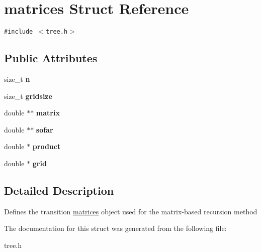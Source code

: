 \hypertarget{structmatrices}{
\section{matrices Struct Reference}
\label{structmatrices}
}
{\tt \#include $<$tree.h$>$}

\subsection*{Public Attributes}
\begin{CompactItemize}
\item 
\hypertarget{structmatrices_536069a6856792235214d6dab9941ce1}{
size\_\-t \textbf{n}}
\label{structmatrices_536069a6856792235214d6dab9941ce1}

\item 
\hypertarget{structmatrices_92cdda519980912b53ca23558f6d4014}{
size\_\-t \textbf{gridsize}}
\label{structmatrices_92cdda519980912b53ca23558f6d4014}

\item 
\hypertarget{structmatrices_b0d9539ad3d40b0659ee22d179381ea7}{
double $\ast$$\ast$ \textbf{matrix}}
\label{structmatrices_b0d9539ad3d40b0659ee22d179381ea7}

\item 
\hypertarget{structmatrices_3fb2932d6765480a2c946b46e8ea87a5}{
double $\ast$$\ast$ \textbf{sofar}}
\label{structmatrices_3fb2932d6765480a2c946b46e8ea87a5}

\item 
\hypertarget{structmatrices_ffc1b871b3e36c8cb7bd7d9f00debc90}{
double $\ast$ \textbf{product}}
\label{structmatrices_ffc1b871b3e36c8cb7bd7d9f00debc90}

\item 
\hypertarget{structmatrices_e195c28f024e4eaa5bdf7f273562932d}{
double $\ast$ \textbf{grid}}
\label{structmatrices_e195c28f024e4eaa5bdf7f273562932d}

\end{CompactItemize}


\subsection{Detailed Description}
Defines the transition \hyperlink{structmatrices}{matrices} object used for the matrix-based recursion method 

The documentation for this struct was generated from the following file:\begin{CompactItemize}
\item 
tree.h\end{CompactItemize}
